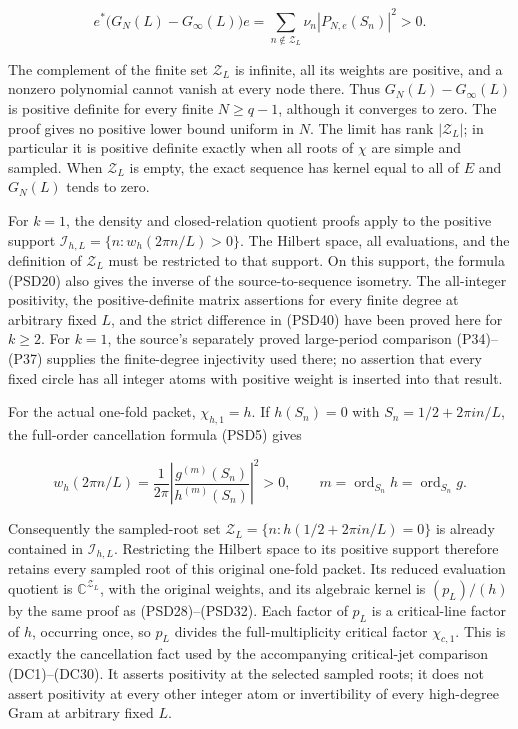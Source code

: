 \[
e^*\bigl(G_N(L)-G_\infty(L)\bigr)e
=\sum_{n\notin\mathcal Z_L}\nu_n|P_{N,e}(S_n)|^2>0.
\tag{PSD40}
\]

The complement of the finite set \(\mathcal Z_L\) is infinite, all its weights are positive, and a nonzero polynomial cannot vanish at every node there. Thus \(G_N(L)-G_\infty(L)\) is positive definite for every finite \(N\ge q-1\), although it converges to zero. The proof gives no positive lower bound uniform in \(N\). The limit has rank \(|\mathcal Z_L|\); in particular it is positive definite exactly when all roots of \(\chi\) are simple and sampled. When \(\mathcal Z_L\) is empty, the exact sequence has kernel equal to all of \(E\) and \(G_N(L)\) tends to zero.

For \(k=1\), the density and closed-relation quotient proofs apply to the positive support \(\mathcal I_{h,L}=\{n:w_h(2\pi n/L)>0\}\). The Hilbert space, all evaluations, and the definition of \(\mathcal Z_L\) must be restricted to that support. On this support, the formula (PSD20) also gives the inverse of the source-to-sequence isometry. The all-integer positivity, the positive-definite matrix assertions for every finite degree at arbitrary fixed \(L\), and the strict difference in (PSD40) have been proved here for \(k\ge2\). For \(k=1\), the source's separately proved large-period comparison (P34)--(P37) supplies the finite-degree injectivity used there; no assertion that every fixed circle has all integer atoms with positive weight is inserted into that result.

For the actual one-fold packet, \(\chi_{h,1}=h\). If \(h(S_n)=0\) with \(S_n=1/2+2\pi i n/L\), the full-order cancellation formula (PSD5) gives

\[
w_h(2\pi n/L)=\frac1{2\pi}
\left|\frac{g^{(m)}(S_n)}{h^{(m)}(S_n)}\right|^2>0,
\qquad m=\operatorname{ord}_{S_n}h=\operatorname{ord}_{S_n}g.
\tag{PSD41}
\]

Consequently the sampled-root set \(\mathcal Z_L=\{n:h(1/2+2\pi i n/L)=0\}\) is already contained in \(\mathcal I_{h,L}\). Restricting the Hilbert space to its positive support therefore retains every sampled root of this original one-fold packet. Its reduced evaluation quotient is \(\mathbb{C}^{\mathcal Z_L}\), with the original weights, and its algebraic kernel is \((p_L)/(h)\) by the same proof as (PSD28)--(PSD32). Each factor of \(p_L\) is a critical-line factor of \(h\), occurring once, so \(p_L\) divides the full-multiplicity critical factor \(\chi_{c,1}\). This is exactly the cancellation fact used by the accompanying critical-jet comparison (DC1)--(DC30). It asserts positivity at the selected sampled roots; it does not assert positivity at every other integer atom or invertibility of every high-degree Gram at arbitrary fixed \(L\).
